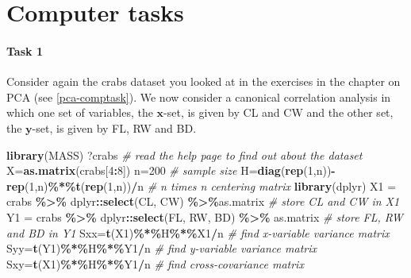 \documentclass[
]{book}
\newenvironment{Shaded}{\begin{snugshade}}{\end{snugshade}}
\newcommand{\CommentTok}[1]{\textcolor[rgb]{0.56,0.35,0.01}{\textit{#1}}}
\newcommand{\DecValTok}[1]{\textcolor[rgb]{0.00,0.00,0.81}{#1}}
\newcommand{\FunctionTok}[1]{\textcolor[rgb]{0.13,0.29,0.53}{\textbf{#1}}}
\newcommand{\NormalTok}[1]{#1}
\newcommand{\OtherTok}[1]{\textcolor[rgb]{0.56,0.35,0.01}{#1}}
\newcommand{\SpecialCharTok}[1]{\textcolor[rgb]{0.81,0.36,0.00}{\textbf{#1}}}
\theoremstyle{definition}
\theoremstyle{definition}
\theoremstyle{definition}
\theoremstyle{definition}
\theoremstyle{remark}
\begin{document}
\hypertarget{computer-tasks-1}{%
\section{Computer tasks}\label{computer-tasks-1}}

\hypertarget{task-1}{%
\paragraph*{Task 1}\label{task-1}}

Consider again the crabs dataset you looked at in the exercises in the chapter on PCA (see \ref{pca-comptask}).
We now consider a canonical correlation analysis in which one set of variables, the \(\mathbf x\)-set, is given by CL and CW and the
other set, the \(\mathbf y\)-set, is given by FL, RW and BD.

\begin{Shaded}
\begin{Highlighting}[]
\FunctionTok{library}\NormalTok{(MASS)}
\NormalTok{?crabs           }\CommentTok{\# read the help page to find out about the dataset}
\NormalTok{X}\OtherTok{=}\FunctionTok{as.matrix}\NormalTok{(crabs[}\DecValTok{4}\SpecialCharTok{:}\DecValTok{8}\NormalTok{])    }
\NormalTok{n}\OtherTok{=}\DecValTok{200}                                      \CommentTok{\# sample size}
\NormalTok{H}\OtherTok{=}\FunctionTok{diag}\NormalTok{(}\FunctionTok{rep}\NormalTok{(}\DecValTok{1}\NormalTok{,n))}\SpecialCharTok{{-}}\FunctionTok{rep}\NormalTok{(}\DecValTok{1}\NormalTok{,n)}\SpecialCharTok{\%*\%}\FunctionTok{t}\NormalTok{(}\FunctionTok{rep}\NormalTok{(}\DecValTok{1}\NormalTok{,n))}\SpecialCharTok{/}\NormalTok{n  }
\CommentTok{\# n times n centering matrix}
\FunctionTok{library}\NormalTok{(dplyr)}
\NormalTok{X1 }\OtherTok{=}\NormalTok{ crabs }\SpecialCharTok{\%\textgreater{}\%}\NormalTok{ dplyr}\SpecialCharTok{::}\FunctionTok{select}\NormalTok{(CL, CW)  }\SpecialCharTok{\%\textgreater{}\%}\NormalTok{as.matrix            }
\CommentTok{\# store CL and CW in X1}
\NormalTok{Y1 }\OtherTok{=}\NormalTok{ crabs }\SpecialCharTok{\%\textgreater{}\%}\NormalTok{ dplyr}\SpecialCharTok{::}\FunctionTok{select}\NormalTok{(FL, RW, BD) }\SpecialCharTok{\%\textgreater{}\%}\NormalTok{ as.matrix            }
\CommentTok{\# store FL, RW and BD in Y1}
\NormalTok{Sxx}\OtherTok{=}\FunctionTok{t}\NormalTok{(X1)}\SpecialCharTok{\%*\%}\NormalTok{H}\SpecialCharTok{\%*\%}\NormalTok{X1}\SpecialCharTok{/}\NormalTok{n       }\CommentTok{\# find x{-}variable variance matrix}
\NormalTok{Syy}\OtherTok{=}\FunctionTok{t}\NormalTok{(Y1)}\SpecialCharTok{\%*\%}\NormalTok{H}\SpecialCharTok{\%*\%}\NormalTok{Y1}\SpecialCharTok{/}\NormalTok{n       }\CommentTok{\# find y{-}variable variance matrix}
\NormalTok{Sxy}\OtherTok{=}\FunctionTok{t}\NormalTok{(X1)}\SpecialCharTok{\%*\%}\NormalTok{H}\SpecialCharTok{\%*\%}\NormalTok{Y1}\SpecialCharTok{/}\NormalTok{n       }\CommentTok{\# find cross{-}covariance matrix}
\end{Highlighting}
\end{Shaded}
\end{document}
